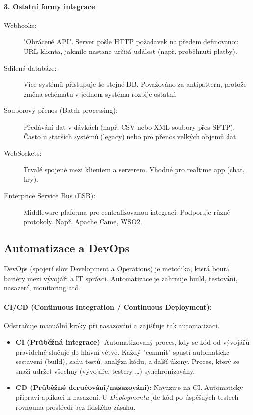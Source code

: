 \paragraph*{3. Ostatní formy integrace}
\begin{description}
    \item[Webhooks:] "Obrácené API". Server pošle HTTP požadavek na předem definovanou URL klienta, jakmile nastane určitá událost (např. proběhnutí platby).
    \item[Sdílená databáze:] Více systémů přistupuje ke stejné DB. Považováno za antipattern, protože změna schématu v jednom systému rozbije ostatní.
    \item[Souborový přenos (Batch processing):] Předávání dat v dávkách (např. CSV nebo XML soubory přes SFTP). Často u starších systémů (legacy) nebo pro přenos velkých objemů dat.
    \item[WebSockets:] Trvalé spojené mezi klientem a serverem. Vhodné pro realtime app (chat, hry).
    \item[Enterprice Service Bus (ESB):] Middleware plaforma pro 
    centralizovanou integraci. Podporuje různé protokoly. Např. Apache Came, WSO2.
\end{description}

\subsection{Automatizace a DevOps}
DevOps (spojení slov Development a Operations) je metodika, která bourá bariéry mezi vývojáři a IT správci.
Automatizace je zahrnuje build, testování, nasazení, monitoring atd.

\paragraph*{CI/CD (Continuous Integration / Continuous Deployment):}
Odstraňuje manuální kroky při nasazování a zajišťuje tak automatizaci.
\begin{itemize}
    \item \textbf{CI (Průběžná integrace):} Automatizovaný proces, kdy se kód od vývojářů pravidelně slučuje do hlavní větve. Každý "commit" spustí automatické sestavení (build), sadu testů, analýza kódu, a další úkony. Proces, který se snaží udržet všechny (vývojáře, testery …) synchronizovány,
    \item \textbf{CD (Průběžné doručování/nasazování):} Navazuje na CI. Automaticky připraví aplikaci k nasazení. U \textit{Deploymentu} jde kód po úspěšných testech rovnouna prostředí bez lidského zásahu.
\end{itemize}

